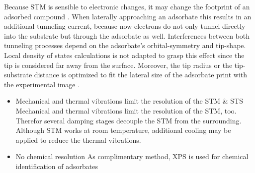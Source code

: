Because STM is sensible to electronic changes, it may change the footprint of an adsorbed compound \cite{sautet_interpretation_1992}. When laterally approaching an adsorbate this results in an additional tunneling current, because now electrons do not only tunnel directly into the substrate but through the adsorbate as well. Interferences between both tunneling processes depend on the adsorbate's orbital-symmetry and tip-shape. Local density of states calculations \cite{tersoff_theory_1985, lang_theory_1986, eigler_imaging_1991} is not adapted to grasp this effect since the tip is considered far away from the surface. Moreover, the tip radius or the tip-substrate distance is optimized to fit the lateral size of the adsorbate print with the experimental image \cite{tersoff_theory_1985, eigler_imaging_1991}.

\begin{itemize}
	\item Mechanical and thermal vibrations limit the resolution of the STM \& STS
	Mechanical and thermal vibrations limit the resolution of the STM, too. Therefor several damping stages decouple the STM from the surrounding. Although STM works at room temperature, additional cooling may be applied to reduce the thermal vibrations.
	\item No chemical resolution
	\subitem As complimentary method, XPS is used for chemical identification of adsorbates
\end{itemize}

